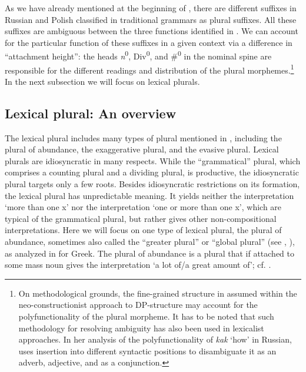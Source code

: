 \documentclass[output=paper,colorlinks,citecolor=brown]{langscibook}
\begin{document}
As we have already mentioned at the beginning of , there are different suffixes in Russian and Polish classified in traditional grammars as plural suffixes. All these suffixes are ambiguous between the three functions identified in . We can account for the particular function of these suffixes in a given context via a difference in ``attachment height'': the heads \textit{n}\textsuperscript{0}, Div\textsuperscript{0}, and \#\textsuperscript{0} in the nominal spine are responsible for the different readings and distribution of the plural morphemes.\footnote{On methodological grounds, the fine-grained structure in  assumed within the neo-constructionist approach to DP-structure may account for the polyfunctionality of the plural morpheme. It has to be noted that such methodology for resolving ambiguity has also been used in lexicalist approaches. In her analysis of the polyfunctionality of \textit{kak} `how' in Russian, \citet{geist:Zimmermann2000} uses insertion into different syntactic positions to disambiguate it as an adverb, adjective, and as a conjunction.} In the next subsection we will focus on lexical plurals.


\subsection{Lexical plural: An overview}\label{sec:geist:4.2}

The lexical plural includes many types of plural mentioned in \citet{Corbett2000}, including the plural of abundance, the exaggerative plural, and the evasive plural. Lexical plurals are idiosyncratic in many respects. While the ``grammatical'' plural, which comprises a counting plural and a dividing plural, is productive, the idiosyncratic plural targets only a few roots. Besides idiosyncratic restrictions on its formation, the lexical plural has unpredictable meaning. It yields neither the interpretation `more than one x' nor the interpretation `one or more than one x', which are typical of the grammatical plural, but rather gives other non-compositional interpretations. Here we will focus on one type of lexical plural, the plural of abundance, sometimes also called the ``greater plural'' or ``global plural'' (see \citealt[30f.,]{Corbett2000}, \citealt[109ff.]{Acquaviva2008}), as analyzed in \citet{Alexiadou2011} for Greek. The plural of abundance is a plural that if attached to some mass noun gives the interpretation `a lot of/a great amount of'; cf. .
\end{document}
